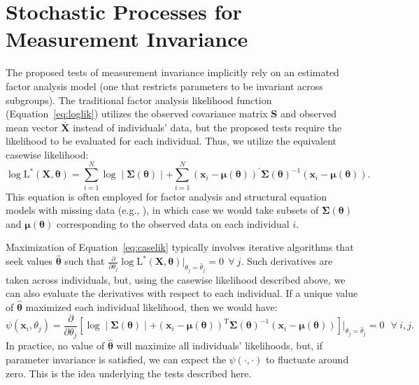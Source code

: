 \documentclass[man]{apa}
\begin{document}
\section{Stochastic Processes for Measurement Invariance}
The proposed tests of measurement invariance implicitly rely on an
estimated factor analysis model (one that restricts parameters to be
invariant across subgroups).
The traditional factor analysis likelihood function 
(Equation~\eqref{eq:loglik}) 
utilizes the observed covariance matrix
${\bm{S}}$ and observed mean vector $\overline{\bm{X}}$
instead of individuals' data, but the proposed tests
require the likelihood to be evaluated for each individual.  Thus, 
we utilize the equivalent casewise likelihood:
\begin{equation}
    \label{eq:caselik}
    \log \text{L}^{\ast}({\bm{X}}, {\bm{\theta}}) = \sum_{i=1}^{N} \log \mid 
\bm{\Sigma}(\bm{\theta}) \mid + \sum_{i=1}^{N} (\bm{x}_i -
\bm{\mu}(\bm{\theta}))^{\prime} \bm{\Sigma}(\bm{\theta})^{-1} (\bm{x}_i -
\bm{\mu}(\bm{\theta})).
\end{equation}
This equation is often employed for factor analysis and structural
equation models with missing data (e.g., ), 
in which case we would take subsets of
$\bm{\Sigma}(\bm{\theta})$ and $\bm{\mu}(\bm{\theta})$ corresponding
to the observed data on each individual $i$.

Maximization of Equation~\eqref{eq:caselik} typically involves iterative
algorithms that seek values $\widehat{{\bm{\theta}}}$ such that
$\frac{\partial}{\partial \theta_j} \log \text{L}^{\ast}({\bm{X}},
{\bm{\theta}}) \big |_{\theta_j = \widehat{\theta}_j} = 0\ \ \forall\ j$.
Such derivatives are taken across individuals, but, using the casewise
likelihood described above, we can also 
evaluate the derivatives with respect to each individual.
If a unique value of $\widehat{{\bm{\theta}}}$ maximized
each individual likelihood, then we would have:
\begin{equation}
    \label{eq:casederiv}
    \psi({\bm{x}}_i, \theta_j) = \frac{\partial}{\partial\theta_j}
\left[ \log \mid 
\bm{\Sigma}(\bm{\theta}) \mid + (\bm{x}_i -
\bm{\mu}(\bm{\theta}))^{\text{T}} \bm{\Sigma}(\bm{\theta})^{-1} (\bm{x}_i -
\bm{\mu}(\bm{\theta}))\right] \bigg |_{\theta_j = \widehat{\theta}_j} = 0\ \ \ \forall\ i, j.
\end{equation}
In practice, no value of $\widehat{{\bm{\theta}}}$ will maximize all
individuals' likelihoods, but, if parameter invariance is satisfied, 
we can expect the $\psi(\cdot, \cdot)$ to fluctuate around zero.  This
is the idea underlying the tests described here.
\end{document}
